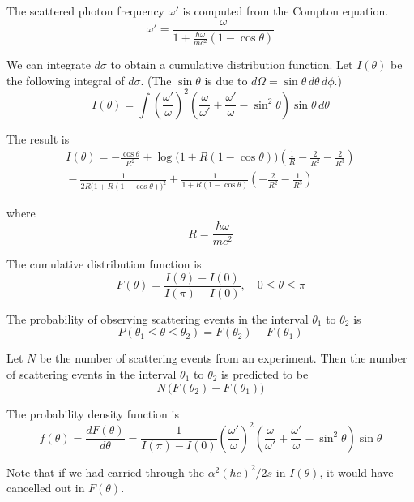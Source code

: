 \documentclass[12pt]{article}
\begin{document}
The scattered photon frequency $\omega'$ is computed from the Compton equation.
\begin{equation*}
\omega'=\frac{\omega}{1+\frac{\hbar\omega}{mc^2}(1-\cos\theta)}
\end{equation*}

We can integrate $d\sigma$ to obtain a cumulative distribution function.
Let $I(\theta)$ be the following integral of $d\sigma$.
(The $\sin\theta$ is due to $d\Omega=\sin\theta\,d\theta\,d\phi$.)
\begin{equation*}
I(\theta)=
\int
\left(\frac{\omega'}{\omega}\right)^2
\left(\frac{\omega}{\omega'}+\frac{\omega'}{\omega}-\sin^2\theta\right)
\sin\theta\,d\theta
\end{equation*}

The result is
\begin{multline*}
I(\theta)=-\frac{\cos\theta}{R^2}
+\log\big(1+R(1-\cos\theta)\big)\left(\frac{1}{R}-\frac{2}{R^2}-\frac{2}{R^3}\right)
\\
{}-\frac{1}{2R\big(1+R(1-\cos\theta)\big)^2}
+\frac{1}{1+R(1-\cos\theta)}\left(-\frac{2}{R^2}-\frac{1}{R^3}\right)
\end{multline*}

where
\begin{equation*}
R=\frac{\hbar\omega}{mc^2}
\end{equation*}

The cumulative distribution function is
\begin{equation*}
F(\theta)=\frac{I(\theta)-I(0)}{I(\pi)-I(0)},
\quad
0\le\theta\le\pi
\end{equation*}

The probability of observing scattering events in the interval $\theta_1$ to $\theta_2$ is
\begin{equation*}
P(\theta_1\le\theta\le\theta_2)=F(\theta_2)-F(\theta_1)
\end{equation*}

Let $N$ be the number of scattering events from an experiment.
Then the number of scattering events in the interval $\theta_1$
to $\theta_2$ is predicted to be
$$
N\,\big(F(\theta_2)-F(\theta_1)\big)
$$

The probability density function is
$$
f(\theta)=\frac{dF(\theta)}{d\theta}
=\frac{1}{I(\pi)-I(0)}
\left(\frac{\omega'}{\omega}\right)^2
\left(\frac{\omega}{\omega'}+\frac{\omega'}{\omega}-\sin^2\theta\right)
\sin\theta
$$

Note that if we had carried through the $\alpha^2(\hbar c)^2/2s$ in $I(\theta)$,
it would have cancelled out in $F(\theta)$.
\end{document}
